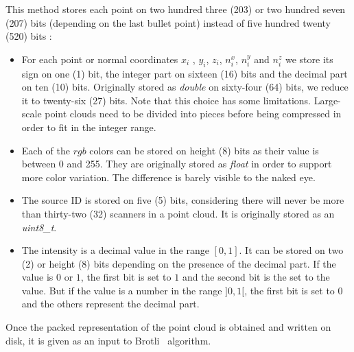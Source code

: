 This method stores each point on two hundred three (203) or two hundred seven (207) bits (depending on the last bullet point) instead of five hundred twenty (520) bits :
\begin{itemize}
\item For each point or normal coordinates $x_i$ , $y_i$, $z_i$, $n_i^x$, $n_i^y$ and $n_i^z$ we store its sign on one (1) bit, the integer part on sixteen (16) bits and the decimal part on ten (10) bits. Originally stored as \emph{double} on sixty-four (64) bits, we reduce it to twenty-six (27) bits. Note that this choice has some limitations. Large-scale point clouds need to be divided into pieces before being compressed in order to fit in the integer range.
\item Each of the $rgb$ colors can be stored on height (8) bits as their value is between 0 and 255. They are originally stored as \emph{float} in order to support more color variation. The difference is barely visible to the naked eye.
\item The source ID is stored on five (5) bits, considering there will never be more than thirty-two (32) scanners in a point cloud. It is originally stored as an \emph{uint8\_t}.
\item The intensity is a decimal value in the range $[0, 1]$. It can be stored on two (2) or height (8) bits depending on the presence of the decimal part. If the value is $0$ or $1$, the first bit is set to $1$ and the second bit is the set to the value. But if the value is a number in the range $]0, 1[$, the first bit is set to $0$ and the others represent the decimal part.
\end{itemize}

Once the packed representation of the point cloud is obtained and written on disk, it is given as an input to Brotli~\cite{brotli} algorithm.

